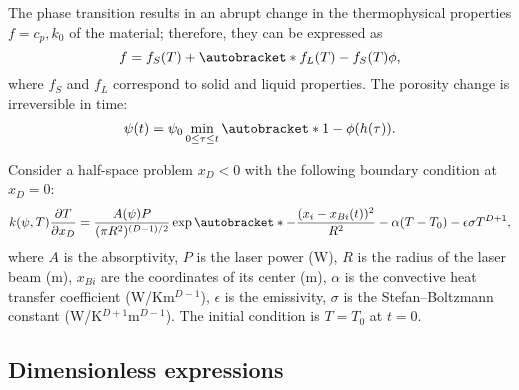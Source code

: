 \documentclass{article}
\newcommand{\pder}[2][]{\frac{\partial#1}{\partial#2}}
\DeclarePairedDelimiter\autobracket()       %
\newcommand{\br}[1]{\autobracket*{#1}}
\begin{document}
The phase transition results in an abrupt change in the thermophysical properties \(f=c_p,k_0\) of the material;
therefore, they can be expressed as
\begin{equation}\label{eq:fusion_change}
	f = f_S(T) + \br{ f_L(T) - f_S(T)}\phi,
\end{equation}
where \(f_S\) and \(f_L\) correspond to solid and liquid properties.
The porosity change is irreversible in time:
\begin{equation}\label{eq:porosity}
	\psi(t) = \psi_0\min_{0\leq\tau\leq t}\br{ 1-\phi(h(\tau)) }.
\end{equation}

Consider a half-space problem \(x_D<0\) with the following boundary condition at \(x_D=0\):
\begin{equation}\label{eq:bc}
	k(\psi,T)\pder[T]{x_D} = \frac{A(\psi)P}{(\pi R^2)^{(D-1)/2}}\exp\br{ -\frac{(x_i-x_{Bi}(t))^2}{R^2} }
	    - \alpha(T-T_0) - \epsilon\sigma T^{D+1},
\end{equation}
where \(A\) is the absorptivity, \(P\) is the laser power (\si{W}), \(R\) is the radius of the laser beam (\si{m}),
\(x_{Bi}\) are the coordinates of its center (\si{m}), \(\alpha\) is the convective heat transfer coefficient (\si{W/Km}\(^{D-1}\)),
\(\epsilon\) is the emissivity, \(\sigma\) is the Stefan--Boltzmann constant (\si{W/K}\(^{D+1}\)\si{m}\(^{D-1}\)).
The initial condition is \(T=T_0\) at \(t=0\).

\subsection{Dimensionless expressions}
\end{document}

